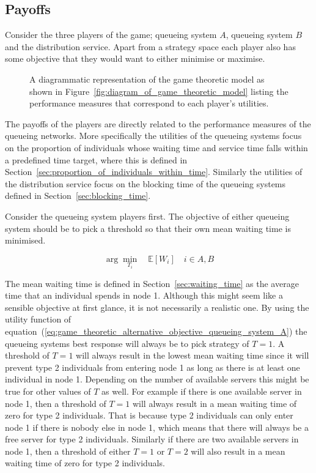 \subsection{Payoffs}

Consider the three players of the game; queueing system \(A\), queueing system
\(B\) and
the distribution service.
Apart from a strategy space each player also has some objective that they would
want to either minimise or maximise.

\begin{figure}[H]
    
    \caption{A diagrammatic representation of the game theoretic model as shown
    in Figure~\ref{fig:diagram_of_game_theoretic_model} listing the performance
    measures that correspond to each player's utilities.}
    \label{fig:diagram_of_game_theoretic_model_objectives}
\end{figure}


The payoffs of the players are directly related to the performance measures of
the queueing networks.
More specifically the utilities of the queueing systems focus on the proportion
of individuals whose waiting time and service time falls within a predefined
time target, where this is defined in
Section~\ref{sec:proportion_of_individuals_within_time}.
Similarly the utilities of the distribution service focus on the blocking time
of the queueing systems defined in Section~\ref{sec:blocking_time}.

Consider the queueing system players first.
The objective of either queueing system should be to pick a threshold so that
their own mean waiting time is minimised.

\begin{equation}\label{eq:game_theoretic_alternative_objective_queueing_system_A}
    \arg \min_{T_i} \quad \mathbb{E}[W_i] \quad i \in {A, B}
\end{equation}

The mean waiting time is defined in Section~\ref{sec:waiting_time} as the
average time that an individual spends in node 1.
Although this might seem like a sensible objective at first glance, it is not
necessarily a realistic one.
By using the utility function of
equation~(\ref{eq:game_theoretic_alternative_objective_queueing_system_A})
the queueing systems best response will always be to pick strategy of \(T=1\).
A threshold of \(T=1\) will always result in the lowest mean waiting time
since it will prevent type 2 individuals from entering node 1 as long as there
is at least one individual in node 1.
Depending on the number of available servers this might be true for other values
of \(T\) as well.
For example if there is one available server in node 1, then a threshold of
\(T=1\) will always result in a mean waiting time of zero for type 2
individuals.
That is because type 2 individuals can only enter node 1 if there is nobody
else in node 1, which means that there will always be a free server for type 2
individuals.
Similarly if there are two available servers in node 1, then a threshold of
either \(T=1\) or \(T=2\) will also result in a mean waiting time of zero for
type 2 individuals.

